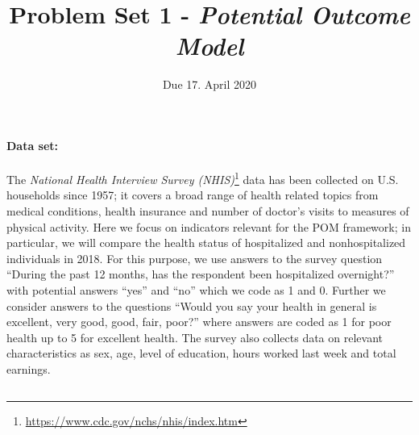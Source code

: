 

\setcounter{section}{1}

\title{{\bfseries\sffamily Problem Set 1} - \emph{Potential Outcome Model}}
\date{\vspace{-30pt} Due 17. April 2020}
\setlength{\droptitle}{-5em}

\pagestyle{fancy}
\fancyhf{}


\maketitle
\thispagestyle{fancy}

\paragraph{Data set:}

The \textit{National Health Interview Survey (NHIS)}\footnote{\href{https://www.cdc.gov/nchs/nhis/index.htm}{https://www.cdc.gov/nchs/nhis/index.htm}} data has been collected on U.S. households since 1957; it covers a broad range of health related topics from medical conditions, health insurance and number of doctor’s visits to measures of physical activity.
Here we focus on indicators relevant for the POM framework; in particular, we will compare the health status of hospitalized and nonhospitalized individuals in 2018.
For this purpose, we use answers to the survey question ``During the past 12 months, has the respondent been hospitalized overnight?'' with potential answers ``yes'' and ``no'' which we code as 1 and 0. Further we consider answers to the questions ``Would you say your health in general is excellent, very good, good, fair, poor?'' where answers are coded as 1 for poor health up to 5 for excellent health. The survey also collects data on relevant characteristics as sex, age, level of education, hours worked last week and total earnings.

\subsection{}

